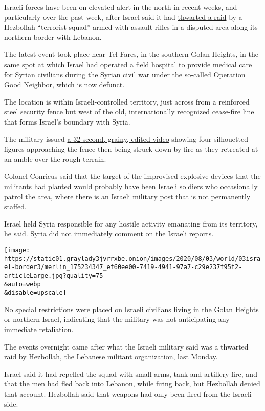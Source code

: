 Israeli forces have been on elevated alert in the north in recent weeks,
and particularly over the past week, after Israel said it had
\href{https://www.nytimes3xbfgragh.onion/2020/07/27/world/middleeast/israel-hezbollah-lebanon-fighting.html?searchResultPosition=1}{thwarted
a raid} by a Hezbollah ``terrorist squad'' armed with assault rifles in
a disputed area along its northern border with Lebanon.

The latest event took place near Tel Fares, in the southern Golan
Heights, in the same spot at which Israel had operated a field hospital
to provide medical care for Syrian civilians during the Syrian civil war
under the so-called
\href{https://www.nytimes3xbfgragh.onion/2017/07/20/world/middleeast/israel-syria-humanitarian-aid.html}{Operation
Good Neighbor}, which is now defunct.

The location is within Israeli-controlled territory, just across from a
reinforced steel security fence but west of the old, internationally
recognized cease-fire line that forms Israel's boundary with Syria.

The military issued
\href{https://spokesperson.gincher.net/releases/gZ61jQcawD3d1zbmZg-4-}{a
32-second, grainy, edited video} showing four silhouetted figures
approaching the fence then being struck down by fire as they retreated
at an amble over the rough terrain.

Colonel Conricus said that the target of the improvised explosive
devices that the militants had planted would probably have been Israeli
soldiers who occasionally patrol the area, where there is an Israeli
military post that is not permanently staffed.

Israel held Syria responsible for any hostile activity emanating from
its territory, he said. Syria did not immediately comment on the Israeli
reports.

\texttt{[image: https://static01.graylady3jvrrxbe.onion/images/2020/08/03/world/03israel-border3/merlin\_175234347\_ef60ee00-7419-4941-97a7-c29e237f95f2-articleLarge.jpg?quality=75\\\&auto=webp\\\&disable=upscale]}

No special restrictions were placed on Israeli civilians living in the
Golan Heights or northern Israel, indicating that the military was not
anticipating any immediate retaliation.

The events overnight came after what the Israeli military said was a
thwarted raid by Hezbollah, the Lebanese militant organization, last
Monday.

Israel said it had repelled the squad with small arms, tank and
artillery fire, and that the men had fled back into Lebanon, while
firing back, but Hezbollah denied that account. Hezbollah said that
weapons had only been fired from the Israeli side.

